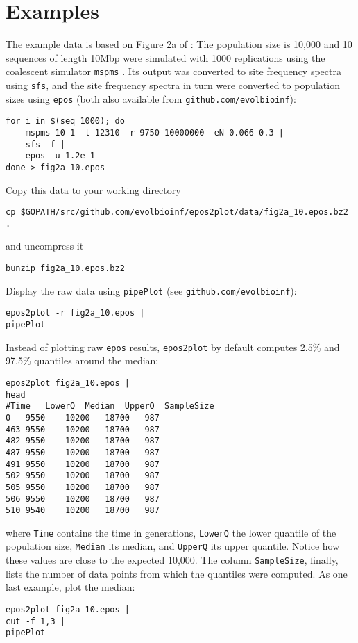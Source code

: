 \documentclass{article}
\newcommand{\ty}{\texttt}
\begin{document}
\section{Examples}
The example data is based on Figure 2a of \cite{liu15:exp}: The population size
is 10,000 and 10 sequences of length 10Mbp were simulated with 1000
replications using the coalescent simulator
\ty{mspms} \citep{kel16:eff}. Its output was
converted to site frequency spectra using
\ty{sfs}, and the site frequency
spectra in turn were converted to population sizes using
\ty{epos} (both also available from \ty{github.com/evolbioinf}):
\begin{verbatim}
for i in $(seq 1000); do
	mspms 10 1 -t 12310 -r 9750 10000000 -eN 0.066 0.3 | 
	sfs -f |
	epos -u 1.2e-1
done > fig2a_10.epos
\end{verbatim}
Copy this data to your working directory
\begin{verbatim}
cp $GOPATH/src/github.com/evolbioinf/epos2plot/data/fig2a_10.epos.bz2 .
\end{verbatim}
and uncompress it
\begin{verbatim}
bunzip fig2a_10.epos.bz2
\end{verbatim}
Display the raw data using \ty{pipePlot}
(see \ty{github.com/evolbioinf}):
\begin{verbatim}
epos2plot -r fig2a_10.epos | 
pipePlot
\end{verbatim}
Instead of plotting raw \ty{epos} results, 
\ty{epos2plot} by default computes 2.5\% and 97.5\% quantiles around the median: 
\begin{verbatim}
epos2plot fig2a_10.epos | 
head
#Time	LowerQ	Median	UpperQ	SampleSize
0	9550	10200	18700	987
463	9550	10200	18700	987
482	9550	10200	18700	987
487	9550	10200	18700	987
491	9550	10200	18700	987
502	9550	10200	18700	987
505	9550	10200	18700	987
506	9550	10200	18700	987
510	9540	10200	18700	987
\end{verbatim}
where \ty{Time} contains the time in generations, 
\ty{LowerQ} the lower quantile of the population size, \ty{Median} its
median, and \ty{UpperQ} its upper
quantile. Notice how these values are close to the expected
10,000. The column \ty{SampleSize}, finally, lists the number of data points from which the
quantiles were computed. As one last example, plot the median:
\begin{verbatim}
epos2plot fig2a_10.epos | 
cut -f 1,3 |
pipePlot
\end{verbatim}


\end{document}
